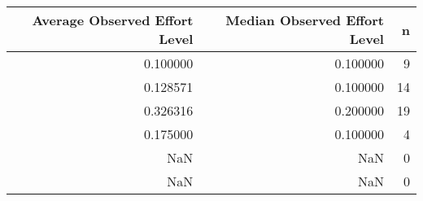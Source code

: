 \begin{tabular}{rrr}
\toprule
Average Observed Effort Level & Median Observed Effort Level & n \\
\midrule
0.100000 & 0.100000 & 9 \\
0.128571 & 0.100000 & 14 \\
0.326316 & 0.200000 & 19 \\
0.175000 & 0.100000 & 4 \\
NaN & NaN & 0 \\
NaN & NaN & 0 \\
\bottomrule
\end{tabular}
